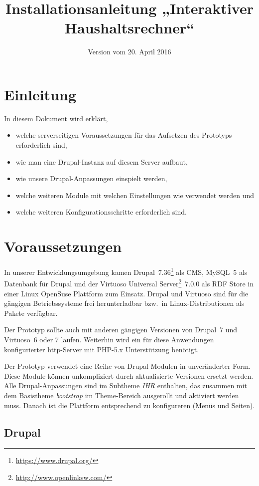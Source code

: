 \documentclass[a4paper,11pt,twoside]{article}
\title{Installationsanleitung „Interaktiver Haushaltsrechner“}
\date{Version vom 20. April 2016}
\begin{document}
\maketitle
\tableofcontents
\newpage
\seitezwei
\newpage

\section{Einleitung}
In diesem Dokument wird erklärt, 
\begin{itemize}\itemsep0pt
\item welche serverseitigen Voraussetzungen für das Aufsetzen des Prototyps
  erforderlich sind, 
\item wie man eine Drupal-Instanz auf diesem Server aufbaut, 
\item wie unsere Drupal-Anpassungen einspielt werden, 
\item welche weiteren Module mit welchen Einstellungen wie verwendet werden und
\item welche weiteren Konfigurationsschritte erforderlich sind.
\end{itemize}

\section{Voraussetzungen}
In unserer Entwicklungsumgebung kamen
Drupal~7.36\footnote{\url{https://www.drupal.org/}} als CMS, MySQL~5 als
Datenbank für Drupal und der Virtuoso Universal
Server\footnote{\url{http://www.openlinksw.com/}}~7.0.0 als RDF Store in einer
Linux OpenSuse Plattform zum Einsatz.  Drupal und Virtuoso sind für die
gängigen Betriebssysteme frei herunterladbar bzw.\ in Linux-Distributionen als
Pakete verfügbar.

Der Prototyp sollte auch mit anderen gängigen Versionen von Drupal~7 und
Virtuoso~6 oder 7 laufen.  Weiterhin wird ein für diese Anwendungen
konfigurierter http-Server mit PHP-5.x Unterstützung benötigt.

Der Prototyp verwendet eine Reihe von Drupal-Modulen in unveränderter Form.
Diese Module können unkompliziert durch aktualisierte Versionen ersetzt
werden.  Alle Drupal-Anpassungen sind im Subtheme \emph{IHR} enthalten, das
zusammen mit dem Basistheme \emph{bootstrap} im Theme-Bereich ausgerollt und
aktiviert werden muss. Danach ist die Plattform entsprechend zu konfigureren
(Menüs und Seiten). 

\subsection{Drupal}
\end{document}
